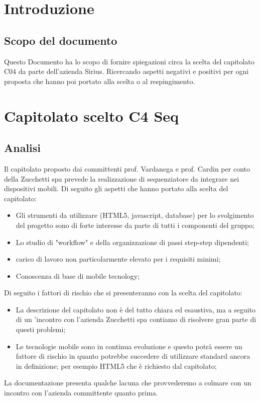 
\section{Introduzione}
\subsection{Scopo del documento}
Questo Documento ha lo scopo di fornire spiegazioni circa la scelta del capitolato C04 da parte dell'azienda Sirius. Ricercando aspetti negativi e positivi per ogni proposta che hanno poi portato alla scelta o al respingimento.\\

\section{Capitolato scelto C4 Seq}
\subsection{Analisi}
Il capitolato proposto dai committenti prof. Vardanega e prof. Cardin per conto della Zucchetti spa prevede la realizzazione di sequenziatore da integrare nei dispositivi mobili.
Di seguito gli aspetti che hanno portato alla scelta del capitolato:
\begin{itemize}
\item Gli strumenti da utilizzare (HTML5, javascript, database) per lo svolgimento del progetto sono di forte interesse da parte di tutti i componenti del gruppo;
\item Lo studio di "workflow" e della organizzazione di passi step-step dipendenti;
\item carico di lavoro non particolarmente elevato per i requisiti minimi;
\item Conoscenza di base di mobile tecnology;
\end{itemize}
Di seguito i fattori di rischio che si presenteranno con la scelta del capitolato:
\begin{itemize}
\item La descrizione del capitolato non è del tutto chiara ed esaustiva, ma a seguito di un 'incontro con l'azienda Zucchetti spa contiamo di risolvere gran parte di questi problemi;
\item Le tecnologie mobile sono in continua evoluzione e questo potrà essere un fattore di rischio in quanto potrebbe succedere di utilizzare standard ancora in definizione; per esempio HTML5 che è richiesto dal capitolato;
\end{itemize}
La documentazione presenta qualche lacuna che provvederemo a colmare con un incontro con l'azienda committente quanto prima.\\
